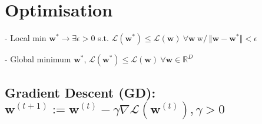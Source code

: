 \section{Optimisation}


- Local min $\mathbf{w^*}\rightarrow \exists \epsilon > 0$ s.t.
$\mathcal{L}(\mathbf{w^*}) \leq \mathcal{L}(\mathbf{w}) \ \forall \mathbf{w} \ \text{w/} \ \Vert \mathbf{w}-\mathbf{w^*} \Vert < \epsilon$

- Global minimum $\mathbf{w^*}$,
$\mathcal{L}(\mathbf{w^*}) \leq \mathcal{L}(\mathbf{w}) \ \forall \mathbf{w} \in \mathbb{R}^D$




\subsection*{Gradient Descent (GD): $
\mathbf{w}^{(t+1)}:=\mathbf{w}^{(t)}-\gamma \nabla \mathcal{L}(\mathbf{w}^{(t)}), \gamma>0
$}








